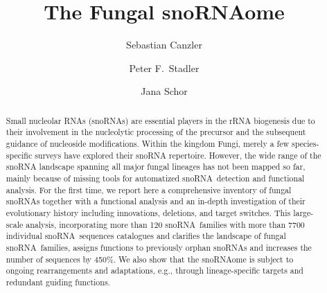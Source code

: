\documentclass[preprint,3p,times]{elsarticle}
\newcommand{\NEW}[1]{\begingroup\color{black}#1\endgroup}
\newcommand{\sno}{snoRNA}
\begin{document}
\begin{frontmatter}

\title{The Fungal snoRNAome}

\author[LEI]{Sebastian Canzler}
\author[LEI,IZBI,MPI,IZI,RTH,TBI,SFI]{Peter F.\ Stadler}
\author[UFZ]{Jana Schor}

\address[LEI]{Bioinformatics Group, Department of Computer Science,
  Leipzig University,
  H{\"a}rtelstra{\ss}e 16-18, D-04107 Leipzig, Germany
}
\address[IZBI]{Interdisciplinary Center for Bioinformatics,
  German Centre for Integrative Biodiversity Research (iDiv)
  Halle-Jena-Leipzig, Competence Center for Scalable Data Services
  and Solutions, and Leipzig Research Center for Civilization Diseases,
  Leipzig University
}
\address[UFZ]{Young Investigators Group Bioinformatics and Transcriptomics, 
  Department Proteomics, 
  Helmholtz Centre for Environmental Research -- UFZ, 
  Permoserstra{\ss}e 15,
  D-04318 Leipzig, Germany
}
\address[IZI]{Department of Diagnostics, 
  Fraunhofer Institute for Cell Therapy and Immunology -- IZI,
  Perlickstra{\ss}e 1, 
  D-04103 Leipzig, Germany
}
\address[MPI]{Max Planck Institute for Mathematics in the Sciences,
  Inselstra{\ss}e 22, D-04103 Leipzig, Germany
}
\address[TBI]{Department of Theoretical Chemistry,
  University of Vienna,
  W{\"a}hringerstra{\ss}e 17, A-1090 Wien, Austria
}
\address[RTH]{Center for non-coding RNA in Technology and Health,
  University of Copenhagen, Gr{\o}nneg{\aa}rdsvej 3, 
  DK-1870 Frederiksberg C, Denmark
}
\address[SFI]{Santa Fe Institute, 1399 Hyde Park Rd., Santa Fe, NM 87501,
  USA\\[1em]
}




\begin{abstract}
  Small nucleolar RNAs (snoRNAs) are essential players in the rRNA
  biogenesis due to their involvement in the nucleolytic processing of
  the precursor and the subsequent guidance of nucleoside
  modifications. Within the kingdom Fungi, merely a few species-specific
  surveys have explored their snoRNA repertoire. However, the wide
  range of the snoRNA landscape spanning all major fungal lineages has
  not been mapped so far, mainly because of missing tools for
  automatized \sno\ detection and functional analysis. For the first
  time, we report here a comprehensive inventory of fungal \sno s together
  with a functional analysis and an in-depth investigation of their
  evolutionary history including innovations, deletions, and target
  switches. This large-scale analysis, incorporating more than 120
  \sno\ families with more than 7700 individual \sno\ sequences
  \NEW{catalogues and clarifies the landscape of fungal \sno\ families, assigns
    functions to previously orphan \sno s and increases the number of
    sequences by 450\%. We also show} that the \sno ome is subject to
  ongoing rearrangements and adaptations, e.g., through
  lineage-specific targets and redundant guiding functions.


\end{abstract}
\end{frontmatter}
\end{document}
